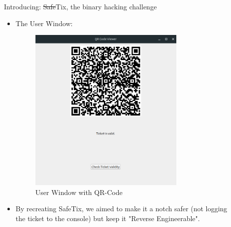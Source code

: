 \documentclass[final,dvipsnames]{beamer}
\newlength{\sepwidth}
\newlength{\colwidth}
\newcommand{\separatorcolumn}{\begin{column}{\sepwidth}\end{column}}
\begin{document}
\begin{frame}[t, fragile]
\begin{columns}[t]
\begin{column}{\colwidth}
\begin{block}{Introducing: \sout{Safe}Tix, the binary hacking challenge}
\begin{itemize}
\begin{figure}[h]
				\caption{WorkFlow of the Program}
				\label{fig:WorkFlow1}
			\end{figure}
            \item The User Window:
            \begin{figure}[h]
				\centering
				\includegraphics[width=0.8\textwidth]{figures/QR_Window.png}
				\caption{User Window with QR-Code}
				\label{fig:WorkFlow1}
			\end{figure}
            \item By recreating SafeTix, we aimed to make it a notch safer (not logging the ticket to the console) but keep it "Reverse Engineerable".
		\end{itemize}

	\end{block}

\end{column}

\separatorcolumn

\begin{column}{\colwidth}


\end{column}
\end{columns}
\end{frame}
\end{document}
